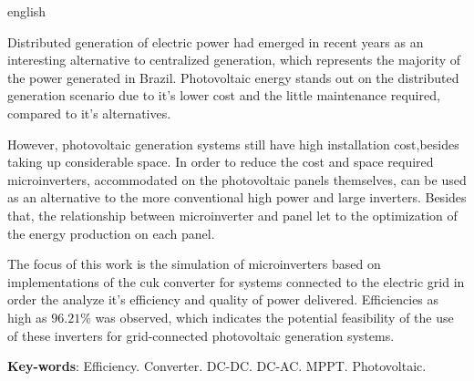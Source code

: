 \documentclass[
	12pt,				%
	openany,
	onseside,
	a4paper,			%
	english,			%
	french,				%
	spanish,			%
	brazil,				%
	]{abntex2}
\begin{document}
	\AtBeginShipoutNext{\AtBeginShipoutNext{\AtBeginShipoutDiscard}}
	\begin{resumo}[Abstract]
		\begin{otherlanguage*}{english}

		Distributed generation of electric power had emerged in recent years as an interesting alternative to centralized generation, which represents the majority of the power generated in Brazil. Photovoltaic energy stands out on the distributed generation scenario due to it's lower cost and the little maintenance required, compared to it's alternatives. 

		However, photovoltaic generation systems still have high installation cost,besides taking up considerable space. In order to reduce the cost and space required microinverters, accommodated on the photovoltaic panels themselves, can be used as an alternative to the more conventional high power and large inverters. Besides that, the relationship between microinverter and panel let to the optimization of the energy production on each panel.

		The focus of this work is the simulation  of microinverters based on implementations of the cuk converter for systems connected to the electric grid in order the analyze it's efficiency and quality of power delivered. Efficiencies as high as $96.21\%$ was observed, which indicates the potential feasibility of the use of these inverters for grid-connected photovoltaic generation systems.

		\vspace{\onelineskip}
		\noindent
		\textbf{Key-words}: Efficiency. Converter. DC-DC. DC-AC. MPPT. Photovoltaic. 
	\end{otherlanguage*}
	\end{resumo}

	\listoffigures*
	\clearpage

	\listoftables*
	\clearpage
\end{document}
